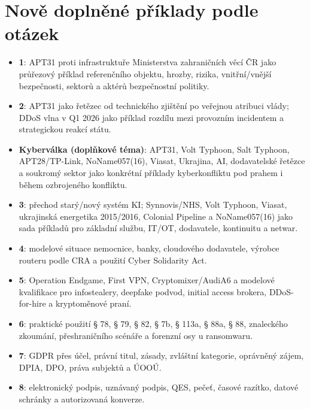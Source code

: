 \section*{Nově doplněné příklady podle otázek}
\begin{itemize}
  \item \textbf{1}: APT31 proti infrastruktuře Ministerstva zahraničních věcí ČR jako průřezový příklad referenčního objektu, hrozby, rizika, vnitřní/vnější bezpečnosti, sektorů a aktérů bezpečnostní politiky.
  \item \textbf{2}: APT31 jako řetězec od technického zjištění po veřejnou atribuci vlády; DDoS vlna v Q1 2026 jako příklad rozdílu mezi provozním incidentem a strategickou reakcí státu.
  \item \textbf{Kyberválka (doplňkové téma)}: APT31, Volt Typhoon, Salt Typhoon, APT28/TP-Link, NoName057(16), Viasat, Ukrajina, AI, dodavatelské řetězce a soukromý sektor jako konkrétní příklady kyberkonfliktu pod prahem i během ozbrojeného konfliktu.
  \item \textbf{3}: přechod starý/nový systém KI; Synnovis/NHS, Volt Typhoon, Viasat, ukrajinská energetika 2015/2016, Colonial Pipeline a NoName057(16) jako sada příkladů pro základní službu, IT/OT, dodavatele, kontinuitu a netwar.
  \item \textbf{4}: modelové situace nemocnice, banky, cloudového dodavatele, výrobce routeru podle CRA a použití Cyber Solidarity Act.
  \item \textbf{5}: Operation Endgame, First VPN, Cryptomixer/AudiA6 a modelové kvalifikace pro infostealery, deepfake podvod, initial access brokera, DDoS-for-hire a kryptoměnové praní.
  \item \textbf{6}: praktické použití § 78, § 79, § 82, § 7b, § 113a, § 88a, § 88, znaleckého zkoumání, přeshraničního scénáře a forenzní osy u ransomwaru.
  \item \textbf{7}: GDPR přes účel, právní titul, zásady, zvláštní kategorie, oprávněný zájem, DPIA, DPO, práva subjektů a ÚOOÚ.
  \item \textbf{8}: elektronický podpis, uznávaný podpis, QES, pečeť, časové razítko, datové schránky a autorizovaná konverze.
\end{itemize}

